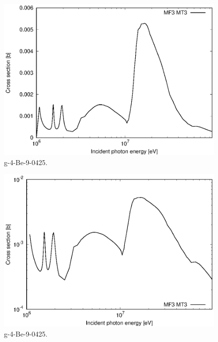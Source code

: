 \begin{figure}
 \includegraphics[width=\linewidth]{eps/g_4-Be-9_0425.eps}
  \caption{g-4-Be-9-0425.}
\end{figure}
\begin{figure}
 \includegraphics[width=\linewidth]{eps-log/g_4-Be-9_0425.eps}
 \caption{g-4-Be-9-0425.}
\end{figure}
\newpage \clearpage

